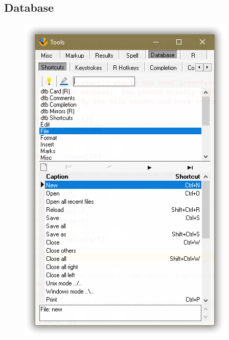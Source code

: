 \hypertarget{working_tools_database}{}
\subsection{Database}

\begin{figure}[H]
  \includegraphics[scale=0.35]{./res/tools_database_shortcuts.png}~~

\end{figure}
